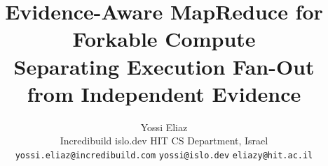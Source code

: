 \documentclass[10pt,twocolumn]{article}
\title{\vspace{-1.5em}\textbf{Evidence-Aware MapReduce for Forkable Compute}\\[-0.15em]
\large Separating Execution Fan-Out from Independent Evidence}
\author{%
  Yossi Eliaz\\
  \normalsize Incredibuild \quad\textbar\quad islo.dev \quad\textbar\quad HIT CS Department, Israel\\
  \normalsize\texttt{yossi.eliaz@incredibuild.com} \quad \texttt{yossi@islo.dev} \quad \texttt{eliazy@hit.ac.il}
}
\date{}
\begin{document}
\maketitle



\balance


\end{document}
